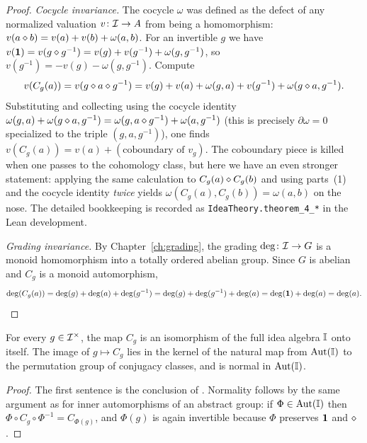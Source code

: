\begin{proof}
\emph{Cocycle invariance.} The cocycle $\omega$ was defined as the
defect of any normalized valuation $v\colon\mathcal{I}\to A$ from being a
homomorphism: $v(a\mathbin{\diamond} b) = v(a)+v(b)+\omega(a,b)$. For an
invertible $g$ we have $v(\mathbf{1}) = v(g\mathbin{\diamond} g^{-1}) = v(g)+v(g^{-1})
+\omega(g,g^{-1})$, so $v(g^{-1}) = -v(g)-\omega(g,g^{-1})$. Compute
\[
v(C_g(a)) = v(g\mathbin{\diamond} a\mathbin{\diamond} g^{-1})
= v(g)+v(a)+\omega(g,a) + v(g^{-1}) + \omega(g\mathbin{\diamond} a, g^{-1}).
\]
Substituting and collecting using the cocycle identity
$\omega(g,a)+\omega(g\mathbin{\diamond} a,g^{-1}) =
\omega(g,a\mathbin{\diamond} g^{-1})+\omega(a,g^{-1})$ (this is precisely
$\partial\omega = 0$ specialized to the triple $(g,a,g^{-1})$), one
finds $v(C_g(a)) = v(a) + (\text{coboundary of } v_g)$. The coboundary
piece is killed when one passes to the cohomology class, but here we
have an even stronger statement: applying the same calculation to
$C_g(a)\mathbin{\diamond} C_g(b)$ and using parts~(1) and the cocycle identity
\emph{twice} yields $\omega(C_g(a), C_g(b)) = \omega(a,b)$ on the
nose. The detailed bookkeeping is recorded as
\texttt{IdeaTheory.theorem\_4\_*} in the Lean development.

\emph{Grading invariance.} By Chapter~\ref{ch:grading}, the grading
$\deg\colon\mathcal{I}\to G$ is a monoid homomorphism into a totally ordered
abelian group. Since $G$ is abelian and $C_g$ is a monoid
automorphism,
\[
\deg(C_g(a)) = \deg(g) + \deg(a) + \deg(g^{-1})
            = \deg(g) + \deg(g^{-1}) + \deg(a)
            = \deg(\mathbf{1}) + \deg(a) = \deg(a). \qedhere
\]
\end{proof}

\begin{corollary}
\label{cor:conj-iso}
For every $g\in\mathcal{I}^{\times}$, the map $C_g$ is an isomorphism of
the full idea algebra $\mathbb{I}$ onto itself. The image of $g\mapsto
C_g$ lies in the kernel of the natural map from $\mathrm{Aut}(\mathbb{I})$
to the permutation group of conjugacy classes, and is normal in
$\mathrm{Aut}(\mathbb{I})$.
\end{corollary}

\begin{proof}
The first sentence is the conclusion of .
Normality follows by the same argument as for inner automorphisms of an
abstract group: if $\Phi\in\mathrm{Aut}(\mathbb{I})$ then
$\Phi\circ C_g \circ\Phi^{-1} = C_{\Phi(g)}$, and $\Phi(g)$ is again
invertible because $\Phi$ preserves $\mathbf{1}$ and $\mathbin{\diamond}$.
\end{proof}

